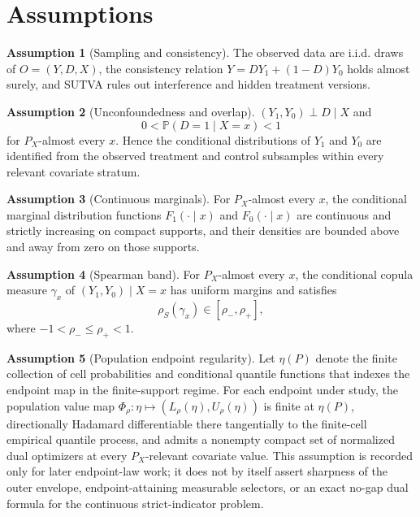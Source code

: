 \documentclass[11pt]{article}
\renewcommand{\Pr}{\mathbb{P}}
\theoremstyle{definition}
\newtheorem{assumption}{Assumption}
\theoremstyle{plain}
\theoremstyle{remark}
\begin{document}
\section{Assumptions}
\label{sec:assumptions}
\begin{assumption}[Sampling and consistency]\label{ass:sampling}
The observed data are i.i.d. draws of \(O=(Y,D,X)\), the consistency relation \(Y=DY_1+(1-D)Y_0\) holds almost surely, and SUTVA rules out interference and hidden treatment versions.
\end{assumption}

\begin{assumption}[Unconfoundedness and overlap]\label{ass:unconf}
\((Y_1,Y_0)\perp D\mid X\) and
\[
0<\Pr(D=1\mid X=x)<1
\]
for \(P_X\)-almost every \(x\).  Hence the conditional distributions of \(Y_1\) and \(Y_0\) are identified from the observed treatment and control subsamples within every relevant covariate stratum.
\end{assumption}

\begin{assumption}[Continuous marginals]\label{ass:continuous}
For \(P_X\)-almost every \(x\), the conditional marginal distribution functions \(F_1(\cdot\mid x)\) and \(F_0(\cdot\mid x)\) are continuous and strictly increasing on compact supports, and their densities are bounded above and away from zero on those supports.
\end{assumption}

\begin{assumption}[Spearman band]\label{ass:band}
For \(P_X\)-almost every \(x\), the conditional copula measure \(\gamma_x\) of \((Y_1,Y_0)\mid X=x\) has uniform margins and satisfies
\[
\rho_S(\gamma_x)\in[\rho_-,\rho_+],
\]
where \(-1<\rho_-\le\rho_+<1\).
\end{assumption}

\begin{assumption}[Population endpoint regularity]\label{ass:regular}
Let \(\eta(P)\) denote the finite collection of cell probabilities and conditional quantile functions that indexes the endpoint map in the finite-support regime.  For each endpoint under study, the population value map \(\Phi_\rho:\eta\mapsto(L_\rho(\eta),U_\rho(\eta))\) is finite at \(\eta(P)\), directionally Hadamard differentiable there tangentially to the finite-cell empirical quantile process, and admits a nonempty compact set of normalized dual optimizers at every \(P_X\)-relevant covariate value.  This assumption is recorded only for later endpoint-law work; it does not by itself assert sharpness of the outer envelope, endpoint-attaining measurable selectors, or an exact no-gap dual formula for the continuous strict-indicator problem.
\end{assumption}
\end{document}
